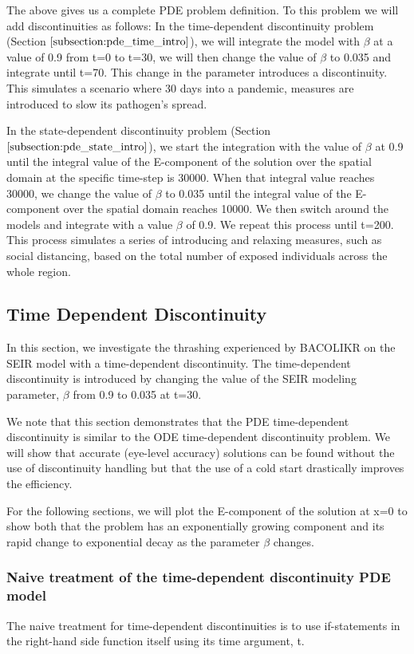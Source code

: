 \documentclass{article}
\begin{document}
The above gives us a complete PDE problem definition. To this problem we will add discontinuities as follows: 
In the time-dependent discontinuity problem (Section $\ref{subsection:pde_time_intro}$), we will integrate the model with $\beta$ at a value of 0.9 from t=0 to t=30, we will then change the value of $\beta$ to 0.035 and integrate until t=70. This change in the parameter introduces a discontinuity. This simulates a scenario where 30 days into a pandemic, measures are introduced to slow its pathogen's spread.

In the state-dependent discontinuity problem (Section $\ref{subsection:pde_state_intro}$), we start the integration with the value of $\beta$ at 0.9 until the integral value of the E-component of the solution over the spatial domain at the specific time-step is 30000. When that integral value reaches 30000, we change the value of $\beta$ to 0.035 until the integral value of the E-component over the spatial domain reaches 10000. We then switch around the models and integrate with a value $\beta$ of 0.9. We repeat this process until t=200. This process simulates a series of introducing and relaxing measures, such as social distancing, based on the total number of exposed individuals across the whole region.

\subsection{Time Dependent Discontinuity}
\label{subsection:pde_time_intro}
In this section, we investigate the thrashing experienced by BACOLIKR on the SEIR model with a time-dependent discontinuity. The time-dependent discontinuity is introduced by changing the value of the SEIR modeling parameter, $\beta$ from 0.9 to 0.035 at t=30.

We note that this section demonstrates that the PDE time-dependent discontinuity is similar to the ODE time-dependent discontinuity problem. We will show that accurate (eye-level accuracy) solutions can be found without the use of discontinuity handling but that the use of a cold start drastically improves the efficiency.

For the following sections, we will plot the E-component of the solution at x=0 to show both that the problem has an exponentially growing component and its rapid change to exponential decay as the parameter $\beta$ changes.

\subsubsection{Naive treatment of the time-dependent discontinuity PDE model}
\label{subsubsection:pde_time_naive}
The naive treatment for time-dependent discontinuities is to use if-statements in the right-hand side function itself using its time argument, t.
\end{document}
